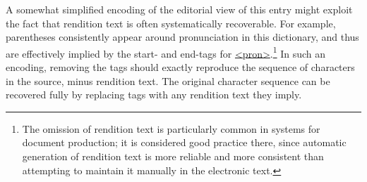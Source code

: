 A somewhat simplified encoding of the editorial view of this entry might exploit the fact that rendition text is often systematically recoverable. For example, parentheses consistently appear around pronunciation in this dictionary, and thus are effectively implied by the start- and end-tags for \hyperref[TEI.pron]{<pron>}.\footnote{The omission of rendition text is particularly common in systems for document production; it is considered good practice there, since automatic generation of rendition text is more reliable and more consistent than attempting to maintain it manually in the electronic text.} In such an encoding, removing the tags should exactly reproduce the sequence of characters in the source, minus rendition text. The original character sequence can be recovered fully by replacing tags with any rendition text they imply.\par

